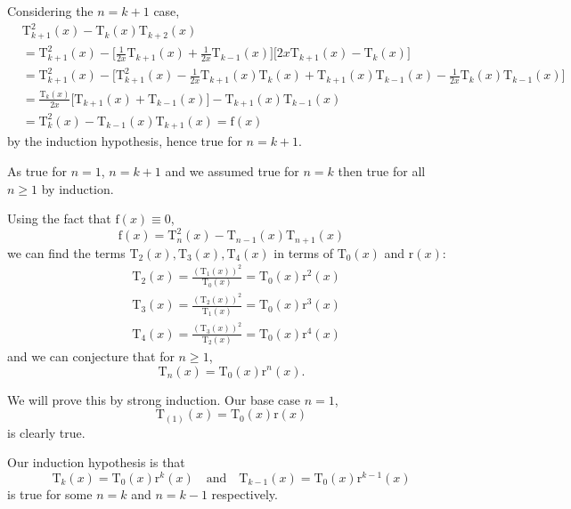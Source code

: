 \documentclass{article}
\begin{document}
\quad Considering the $n=k+1$ case,
\begin{align*}
& \mathrm{T}^2_{k+1}(x) - \mathrm{T}_{k}(x) \mathrm{T}_{k+2}(x) \\
& = \mathrm{T}^2_{k+1}(x) - \Bigg[\frac{1}{2x}\mathrm{T}_{k+1}(x) + \frac{1}{2x}\mathrm{T}_{k-1}(x)\Bigg]\Bigg[2x\mathrm{T}_{k+1}(x) - \mathrm{T}_{k}(x)\Bigg] \\
& = \mathrm{T}^2_{k+1}(x) - \Bigg[\mathrm{T}^2_{k+1}(x) - \frac{1}{2x}\mathrm{T}_{k+1}(x)\mathrm{T}_{k}(x) + \mathrm{T}_{k+1}(x)\mathrm{T}_{k-1}(x)- \frac{1}{2x}\mathrm{T}_{k}(x)\mathrm{T}_{k-1}(x)  \Bigg]\\
& = \frac{\mathrm{T}_{k}(x)}{2x}\Bigg[\mathrm{T}_{k+1}(x)+\mathrm{T}_{k-1}(x)\Bigg] - \mathrm{T}_{k+1}(x)\mathrm{T}_{k-1}(x) \\
& = \mathrm{T}^2_k(x) - \mathrm{T}_{k-1}(x) \mathrm{T}_{k+1}(x) = \mathrm{f}(x)
\end{align*}
by the induction hypothesis, hence true for $n=k+1$.\par 

\quad As true for $n=1$, $n=k+1$ and we assumed true for $n=k$ then true for all $n \geq 1$ by induction.\par

\vspace{0.5cm}

Using the fact that $\mathrm{f}(x)\equiv 0$, 
\[
\mathrm{f}(x) = \mathrm{T}^2_n(x) - \mathrm{T}_{n-1}(x) \mathrm{T}_{n+1}(x)
\]
we can find the terms $\mathrm{T}_2(x),\mathrm{T}_3(x),\mathrm{T}_4(x)$ in terms of $\mathrm{T}_0(x)$ and $\mathrm{r}(x)$:
\begin{align*}
& \mathrm{T}_{2}(x) = \frac{(\mathrm{T}_{1}(x))^2}{\mathrm{T}_{0}(x)} = \mathrm{T}_{0}(x)\mathrm{r}^2(x) \\
& \mathrm{T}_{3}(x) = \frac{(\mathrm{T}_{2}(x))^2}{\mathrm{T}_{1}(x)} = \mathrm{T}_{0}(x)\mathrm{r}^3(x) \\
& \mathrm{T}_{4}(x) = \frac{(\mathrm{T}_{3}(x))^2}{\mathrm{T}_{2}(x)} = \mathrm{T}_{0}(x)\mathrm{r}^4(x)
\end{align*}
and we can conjecture that for $n \geq 1$,
\[
\mathrm{T}_{n}(x) = \mathrm{T}_{0}(x)\mathrm{r}^n(x).
\]


We will prove this by strong induction. Our base case $n=1$,
\[
\mathrm{T}_{(1)}(x) = \mathrm{T}_{0}(x)\mathrm{r}(x)
\]
is clearly true.\par

\quad Our induction hypothesis is that 
\[
\mathrm{T}_{k}(x) = \mathrm{T}_{0}(x)\mathrm{r}^k(x) \quad \text{and} \quad \mathrm{T}_{k-1}(x) = \mathrm{T}_{0}(x)\mathrm{r}^{k-1}(x)
\]
is true for some $n=k$ and $n=k-1$ respectively.\par
\end{document}
